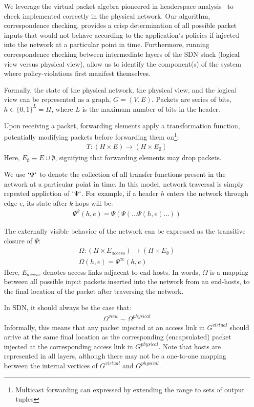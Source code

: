 We leverage the virtual packet algebra pioneered in headerspace
analysis~\cite{hsa} to check 
implemented correctly in the physical network. Our algorithm, correspondence
checking, provides a crisp determination of all possible packet inputs that
would not behave according to the application's policies if injected into the
network at a particular point in time. Furthermore, running correspondence
checking between intermediate layers of the SDN stack (logical view versus
physical view), allow us to identify the component(s) of
the system where policy-violations first manifest themselves.

Formally, the state of the physical network, the physical view, and the
logical view can be represented as a graph,
$G = (V, E)$. Packets are series of bits, $h \in \{0,1\}^L = H$,
where $L$ is the maximum number of bits in the header.

Upon receiving a packet,
forwarding elements apply a transformation function, potentially modifying
packets before forwarding them on\footnote{Multicast forwarding can expressed
by extending the range to sets of output tuples}:
\begin{align*}
T: (H \times E) \rightarrow (H \times E_{\emptyset})
\end{align*}
Here, $E_{\emptyset} \equiv E \cup \emptyset$, signifying that forwarding elements
may drop packets.

We use $`\Psi`$ to denote the collection of all transfer functions present in
the network at a particular point in time. In this model, network traversal is
simply repeated appliction of $`\Psi`$.
For example, if a header $h$ enters the network through edge
$e$, its state after $k$ hops will be:
\begin{align*}
\Psi^k(h,e) = \Psi(\Psi(\dots \Psi(h,e)\dots))
\end{align*}

The externally visible behavior of the network can be expressed as the
transitive closure of $\Psi$:
\begin{align*}
\Omega: (H \times E_{access}) \rightarrow (H \times E_{\emptyset}) \\
\Omega(h,e) = \Psi^{\infty}(h,e)
\end{align*}
Here, $E_{access}$ denotes access links adjacent to end-hosts.
In words, $\Omega$ is a mapping between all possible input packets inserted
into the network from an end-hosts, to the final location of the packet after
traversing the network.

In SDN, it should always be the case that:
\begin{align*}
\Omega^{view} \sim \Omega^{physical}
\end{align*}
Informally, this means that any packet injected at an access link in $G^{virtual}$ should arrive at
the same final location as the corresponding (encapsulated) packet injected at the
corresponding access link in $G^{physical}$. Note that hosts are represented
in all layers, although there may not be a one-to-one mapping between the
internal vertices of $G^{virtual}$ and $G^{physical}$.

